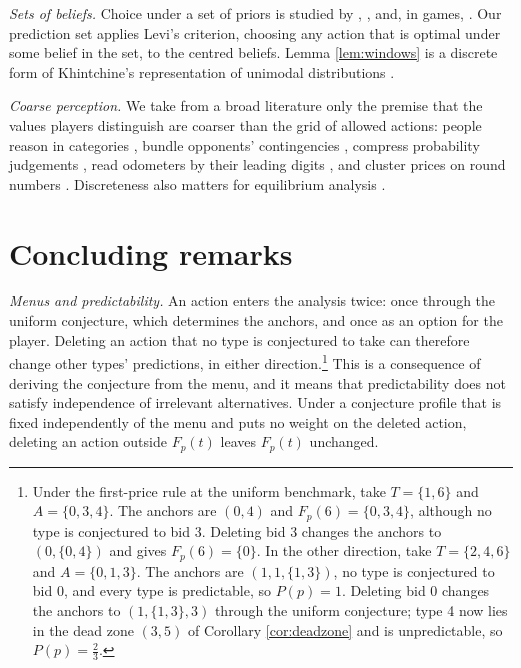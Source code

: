 \documentclass[12pt]{article}
\theoremstyle{definition}
\begin{document}
\emph{Sets of beliefs.} Choice under a set of priors is studied by \citet{levi1974}, \citet{walley1991}, \citet{bewley2002} and, in games, \citet{lo1996}. Our prediction set applies Levi's criterion, choosing any action that is optimal under some belief in the set, to the centred beliefs. Lemma \ref{lem:windows} is a discrete form of Khintchine's representation of unimodal distributions \citep{khintchine1938}.

\emph{Coarse perception.} We take from a broad literature only the premise that the values players distinguish are coarser than the grid of allowed actions: people reason in categories \citep{mss2008coarse}, bundle opponents' contingencies \citep{jehiel2005analogy}, compress probability judgements \citep{enke2023cognitive}, read odometers by their leading digits \citep{lacetera2012heuristic}, and cluster prices on round numbers \citep{harris1991stock}. Discreteness also matters for equilibrium analysis \citep{rasooly2020discrete, filosratsikas2023complexity, bichler2025computing}.

\section{Concluding remarks}\label{sec:outlook}

\emph{Menus and predictability.} An action enters the analysis twice: once through the uniform conjecture, which determines the anchors, and once as an option for the player. Deleting an action that no type is conjectured to take can therefore change other types' predictions, in either direction.\footnote{Under the first-price rule at the uniform benchmark, take $T = \{1,6\}$ and $A = \{0,3,4\}$. The anchors are $(0,4)$ and $F_p(6) = \{0,3,4\}$, although no type is conjectured to bid 3. Deleting bid 3 changes the anchors to $(0, \{0,4\})$ and gives $F_p(6) = \{0\}$. In the other direction, take $T = \{2,4,6\}$ and $A = \{0,1,3\}$. The anchors are $(1, 1, \{1,3\})$, no type is conjectured to bid 0, and every type is predictable, so $P(p) = 1$. Deleting bid 0 changes the anchors to $(1, \{1,3\}, 3)$ through the uniform conjecture; type 4 now lies in the dead zone $(3, 5)$ of Corollary \ref{cor:deadzone} and is unpredictable, so $P(p) = \tfrac23$.} This is a consequence of deriving the conjecture from the menu, and it means that predictability does not satisfy independence of irrelevant alternatives. Under a conjecture profile that is fixed independently of the menu and puts no weight on the deleted action, deleting an action outside $F_p(t)$ leaves $F_p(t)$ unchanged.
\end{document}
